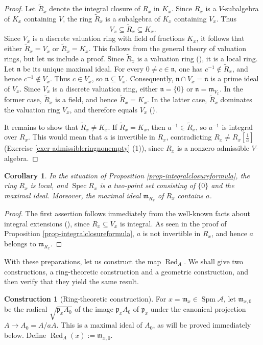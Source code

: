 \documentclass[a4paper,12pt, dvipdfmx]{jsbook}
\def\m{\mathfrak{m}}
\def\til#1{\widetilde{#1}}%
\def\Red{\mathop{\mathrm{Red}}\nolimits}
\def\Spec{\mathop{\mathrm{Spec}}\nolimits}
\def\Spm{\mathop{\mathrm{Spm}}\nolimits}
\theoremstyle{plain}
\newtheorem{cor}[thm]{\bfseries Corollary}
\theoremstyle{definition}
\newtheorem{const}[thm]{\bfseries Construction}
\begin{document}
\begin{proof}[Proof]
Let $\til{R}_x$ denote the integral closure of $R_x$ in $K_x$.
Since $R_x$ is a $V$-subalgebra of $K_x$ containing $V$, the ring $\til{R}_x$ is a subalgebra of $K_x$ containing $V_x$.
Thus
$$
V_x\subseteq\til{R}_x\subseteq K_x.
$$
Since $V_x$ is a discrete valuation ring with field of fractions $K_x$, it follows that either $\til{R}_x=V_x$ or $\til{R}_x=K_x$.
This follows from the general theory of valuation rings, but let us include a proof. Since $\til{R}_x$ is a valuation ring (\cite[Prop.\ 5.18]{AM}), it is a local ring. Let $\mathfrak{n}$ be its unique maximal ideal. For every $0\neq c\in\mathfrak{n}$, one has $c^{-1}\not\in\til{R}_x$, and hence $c^{-1}\not\in V_x$. Thus $c\in V_x$, so $\mathfrak{n}\subseteq V_x$.
Consequently, $\mathfrak{n}\cap V_x=\mathfrak{n}$ is a prime ideal of $V_x$. Since $V_x$ is a discrete valuation ring, either $\mathfrak{n}=\{0\}$ or $\mathfrak{n}=\m_{V_x}$.
In the former case, $\til{R}_x$ is a field, and hence $\til{R}_x=K_x$. In the latter case, $\til{R}_x$ dominates the valuation ring $V_x$, and therefore equals $V_x$ (\cite[Chap.\ 5, Exercise 27 (p.\ 72)]{AM}).

It remains to show that $\til{R}_x\neq K_x$.
If $\til{R}_x=K_x$, then $a^{-1}\in\til{R}_x$, so $a^{-1}$ is integral over $R_x$.
This would mean that $a$ is invertible in $R_x$, contradicting $R_x\neq R_x[\frac{1}{a}]$ (Exercise \ref{exer-admissibleringnonempty} (1)), since $R_x$ is a nonzero admissible $V$-algebra.
\end{proof}

\begin{cor}\label{cor-integralclosureformula}{\rm 
In the situation of Proposition \ref{prop-integralclosureformula}, the ring $R_x$ is local, and $\Spec R_x$ is a two-point set consisting of $\{0\}$ and the maximal ideal.
Moreover, the maximal ideal $\m_{R_x}$ of $R_x$ contains $a$.}
\end{cor}

\begin{proof}[Proof]
The first assertion follows immediately from the well-known facts about integral extensions (\cite[Cor.\ 5.8 \& Theorem 5.10]{AM}), since $R_x\subseteq V_x$ is integral.
As seen in the proof of Proposition \ref{prop-integralclosureformula}, $a$ is not invertible in $R_x$, and hence $a$ belongs to $\m_{R_x}$.
\end{proof}

With these preparations, let us construct the map $\Red_A$.
We shall give two constructions, a ring-theoretic construction and a geometric construction, and then verify that they yield the same result.
\begin{const}[Ring-theoretic construction]\label{const-reductionmapringtheoretic}{\rm 
For $x=\m_x\in\Spm\mathcal{A}$, let $\m_{x,0}$ be the radical $\sqrt{\mathfrak{p}_xA_0}$ of the image $\mathfrak{p}_xA_0$ of $\mathfrak{p}_x$ under the canonical projection $A\rightarrow A_0=A/aA$. This is a maximal ideal of $A_0$, as will be proved immediately below.
Define $\Red_A(x):=\m_{x,0}$.}
\end{const}
\end{document}
